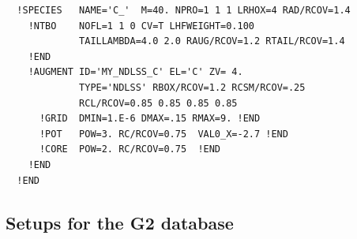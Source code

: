\documentclass[11pt,a4paper]{report}
\begin{document}
\begin{verbatim}
  !SPECIES   NAME='C_'  M=40. NPRO=1 1 1 LRHOX=4 RAD/RCOV=1.4
    !NTBO    NOFL=1 1 0 CV=T LHFWEIGHT=0.100
             TAILLAMBDA=4.0 2.0 RAUG/RCOV=1.2 RTAIL/RCOV=1.4 
    !END 
    !AUGMENT ID='MY_NDLSS_C' EL='C' ZV= 4.
             TYPE='NDLSS' RBOX/RCOV=1.2 RCSM/RCOV=.25
             RCL/RCOV=0.85 0.85 0.85 0.85 
      !GRID  DMIN=1.E-6 DMAX=.15 RMAX=9. !END
      !POT   POW=3. RC/RCOV=0.75  VAL0_X=-2.7 !END
      !CORE  POW=2. RC/RCOV=0.75  !END
    !END
  !END
\end{verbatim}

\subsection{Setups for the G2 database}
\end{document}
